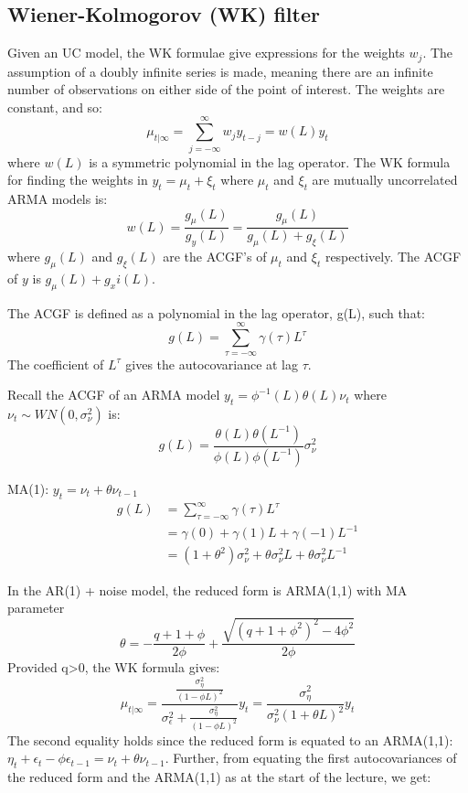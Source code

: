 \documentclass[DIV=14,titlepage=false]{scrreprt}
\begin{document}
\subsection{Wiener-Kolmogorov (WK) filter}
Given an UC model, the WK formulae give expressions for the weights $w_j$. The assumption of a doubly infinite series is made, meaning there are an infinite number of observations on either side of the point of interest. The weights are constant, and so:
\[
    \mu_{t|\infty} = \sum_{j=-\infty}^\infty w_j y_{t-j} = w(L) y_t
\]
where $w(L)$ is a symmetric polynomial in the lag operator. The WK formula for finding the weights in $y_t = \mu_t + \xi_t$ where $\mu_t$ and $\xi_t$ are mutually uncorrelated ARMA models is:
\[
    w(L) = \frac{g_\mu(L)}{g_y(L)} = \frac{g_\mu(L)}{g_\mu(L) + g_\xi(L)}
\]
where $g_\mu(L)$ and $g_\xi(L)$ are the ACGF's of $\mu_t$ and $\xi_t$ respectively. The ACGF of $y$ is $g_\mu(L)+g_xi(L)$.\\
\begin{definition}
    The ACGF is defined as a polynomial in the lag operator, g(L), such that:
    \[
        g(L) = \sum_{\tau = -\infty}^\infty \gamma(\tau) L^\tau
    \]
    The coefficient of $L^\tau$  gives the autocovariance at lag $\tau$.
\end{definition}
Recall the ACGF of an ARMA model $y_t = \phi^{-1}(L)\theta(L) \nu_t$ where $\nu_t \sim WN(0, \sigma^2_\nu)$ is:
\[
    g(L) = \frac{\theta(L)\theta(L^{-1})}{\phi(L)\phi(L^{-1})} \sigma^2_\nu
\]
\begin{example}MA(1): $y_t = \nu_t + \theta \nu_{t-1}$
    \begin{align*}
        g(L) &= \sum_{\tau = -\infty}^\infty \gamma(\tau) L^\tau\\
        &= \gamma(0) + \gamma(1) L + \gamma(-1) L^{-1}\\
        &= (1+\theta^2) \sigma^2_\nu + \theta \sigma^2_\nu L + \theta \sigma^2_\nu L^{-1}
    \end{align*}
\end{example}
In the AR(1) + noise model, the reduced form is ARMA(1,1) with MA parameter 
\[
  \theta = -\frac{q+1+\phi}{2\phi}+\frac{\sqrt{(q+1+\phi^2)^2-4\phi^2}}{2\phi}
\]
Provided q>0, the WK formula gives:
\[
    \mu_{t|\infty} = \frac{\frac{\sigma^2_\eta}{(1-\phi L)^2}}{\sigma^2_\epsilon + \frac{\sigma^2_\eta}{(1-\phi L)^2}} y_t = \frac{\sigma^2_\eta}{\sigma^2_\nu (1+\theta L)^2} y_t
\]
The second equality holds since the reduced form is equated to an ARMA(1,1): $\eta_t + \epsilon_t - \phi \epsilon_{t-1} = \nu_t + \theta \nu_{t-1}$. Further, from equating the first autocovariances of the reduced form and the ARMA(1,1) as at the start of the lecture, we get:
\end{document}
